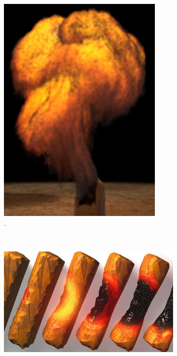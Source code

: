 \begin{figure}[htpb!]
        \centering
        \begin{subfigure}[t]{0.175\textwidth}
                \includegraphics[width=\textwidth]{img/feldman_2003}
                \caption{\cite{Feldman:2003}.}
        \end{subfigure}%
        ~ %
        \begin{subfigure}[t]{0.4\textwidth}
                \includegraphics[width=\textwidth]{img/melek_2005}

\end{subfigure}
\end{figure}
